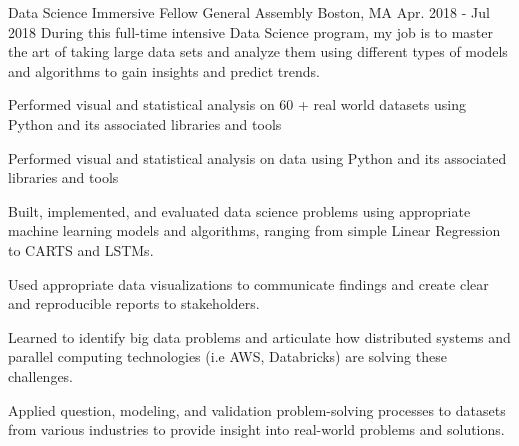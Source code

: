

\begin{cventries}

  \cventry
    {Data Science Immersive Fellow} %
    {General Assembly} %
    {Boston, MA} %
    {Apr. 2018 - Jul 2018} %
    {During this full-time intensive Data Science program, my job is to master the art of taking large data sets and analyze them using different types of models and algorithms to gain insights and predict trends.}
    {
      \begin{cvitems} %
        \item {Performed visual and statistical analysis on 60 + real world datasets using Python and its associated libraries and tools}
        \item {Performed visual and statistical analysis on data using Python and its associated libraries and tools}
        \item {Built, implemented, and evaluated data science problems using appropriate machine learning models and algorithms, ranging from simple Linear Regression to CARTS and LSTMs.}
        \item {Used appropriate data visualizations to communicate findings and create clear and reproducible reports to stakeholders.}
        \item {Learned to identify big data problems and articulate how distributed systems and parallel computing technologies (i.e AWS, Databricks) are solving these challenges.}
        \item {Applied question, modeling, and validation problem-solving processes to datasets from various industries to provide insight into real-world problems and solutions.}
      \end{cvitems}
    }


\end{cventries}
